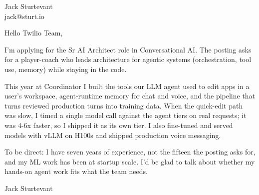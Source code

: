 \documentclass[11pt]{article}
\begin{document}
\raggedright

{\namefont\fontsize{20pt}{24pt}\selectfont Jack Sturtevant}\\[-0.3em]
jack@sturt.io

\vspace{1.2em}

Hello Twilio Team,

I'm applying for the Sr AI Architect role in Conversational AI. The posting asks for a player-coach who leads architecture for agentic systems (orchestration, tool use, memory) while staying in the code.

This year at Coordinator I built the tools our LLM agent used to edit apps in a user's workspace, agent-runtime memory for chat and voice, and the pipeline that turns reviewed production turns into training data. When the quick-edit path was slow, I timed a single model call against the agent tiers on real requests; it was 4-6x faster, so I shipped it as its own tier. I also fine-tuned and served models with vLLM on H100s and shipped production voice messaging.

To be direct: I have seven years of experience, not the fifteen the posting asks for, and my ML work has been at startup scale. I'd be glad to talk about whether my hands-on agent work fits what the team needs.

\vspace{0.6em}
Jack Sturtevant
\end{document}
